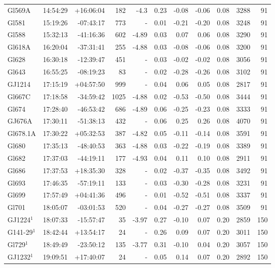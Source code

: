 \documentclass{aa}
\begin{document}
{\begin{longtable}{l r r r r r r r r r r}
Gl569A & 14:54:29 & +16:06:04 & 182 & -4.3 & 0.23 & -0.08 & -0.06 & 0.08 & 3288 &   91 \\
Gl581 & 15:19:26 & -07:43:17 & 773 &    - & 0.01 & -0.21 & -0.20 & 0.08 & 3248 &   91 \\
Gl588 & 15:32:13 & -41:16:36 & 602 & -4.89 & 0.03 & 0.07 & 0.06 & 0.08 & 3290 &   91 \\
Gl618A & 16:20:04 & -37:31:41 & 255 & -4.88 & 0.03 & -0.08 & -0.06 & 0.08 & 3200 &   91 \\
Gl628 & 16:30:18 & -12:39:47 & 451 &    - & 0.03 & -0.02 & -0.02 & 0.08 & 3056 &   91 \\
Gl643 & 16:55:25 & -08:19:23 & 83 &    - & 0.02 & -0.28 & -0.26 & 0.08 & 3102 &   91 \\
GJ1214 & 17:15:19 & +04:57:50 & 999 &    - & 0.04 & 0.06 & 0.05 & 0.08 & 2817 &   91 \\
Gl667C & 17:18:58 & -34:59:42 & 1025 & -4.88 & 0.02 & -0.53 & -0.50 & 0.08 & 3444 &   91 \\
Gl674 & 17:28:40 & -46:53:42 & 686 & -4.89 & 0.06 & -0.25 & -0.23 & 0.08 & 3333 &   91 \\
GJ676A & 17:30:11 & -51:38:13 & 432 &    - & 0.06 & 0.25 & 0.26 & 0.08 & 4070 &   91 \\
Gl678.1A & 17:30:22 & +05:32:53 & 387 & -4.82 & 0.05 & -0.11 & -0.14 & 0.08 & 3591 &   91 \\
Gl680 & 17:35:13 & -48:40:53 & 363 & -4.88 & 0.03 & -0.22 & -0.19 & 0.08 & 3389 &   91 \\
Gl682 & 17:37:03 & -44:19:11 & 177 & -4.93 & 0.04 & 0.11 & 0.10 & 0.08 & 2911 &   91 \\
Gl686 & 17:37:53 & +18:35:30 & 328 &    - & 0.02 & -0.37 & -0.35 & 0.08 & 3492 &   91 \\
Gl693 & 17:46:35 & -57:19:11 & 133 &    - & 0.03 & -0.30 & -0.28 & 0.08 & 3231 &   91 \\
Gl699 & 17:57:49 & +04:41:36 & 496 &    - & 0.01 & -0.52 & -0.51 & 0.08 & 3337 &   91 \\
Gl701 & 18:05:07 & -03:01:53 & 520 &    - & 0.04 & -0.27 & -0.27 & 0.08 & 3509 &   91 \\
GJ1224$^1$ & 18:07:33 & -15:57:47 & 35 & -3.97 & 0.27 & -0.10 & 0.07 & 0.20 & 2859 &  150 \\
G141-29$^1$ & 18:42:44 & +13:54:17 & 24 &    - & 0.26 & 0.09 & 0.07 & 0.20 & 3011 &  150 \\
Gl729$^1$ & 18:49:49 & -23:50:12 & 135 & -3.77 & 0.31 & -0.10 & 0.04 & 0.20 & 3057 &  150 \\
GJ1232$^1$ & 19:09:51 & +17:40:07 & 24 &    - & 0.05 & 0.14 & 0.07 & 0.20 & 2892 &  150 \\

\end{longtable}}
\end{document}
